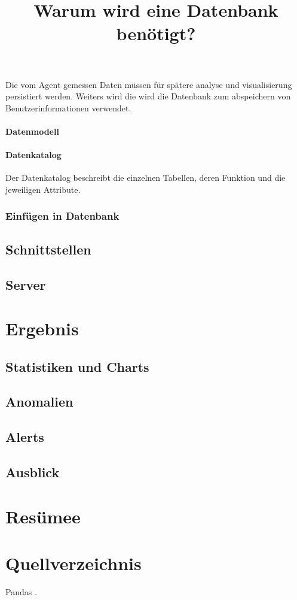 \documentclass{report}
\begin{document}
\title{Warum wird eine Datenbank benötigt?}
Die vom Agent gemessen Daten müssen für spätere analyse und visualisierung persistiert werden. Weiters wird die wird die Datenbank zum abspeichern von Benutzerinformationen verwendet.

\subsubsection{Datenmodell}
\subsubsection{Datenkatalog}
Der Datenkatalog beschreibt die einzelnen Tabellen, deren Funktion und die jeweiligen Attribute.
\subsection{Einfügen in Datenbank}
\section{Schnittstellen}
\section{Server}


\chapter{Ergebnis}
\section{Statistiken und Charts}
\section{Anomalien}
\section{Alerts}
\section{Ausblick}

\chapter{Resümee}


\chapter*{Quellverzeichnis}
Pandas \citep{pandas_docs}.
\end{document}
